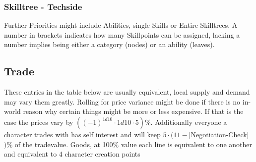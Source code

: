 \documentclass{article}
\begin{document}
    \subsubsection{Skilltree - Techside}
    Further Priorities might include Abilities, single Skills or Entire Skilltrees. A number in brackets indicates how many
    Skillpoints can be assigned, lacking a number implies being either a category (nodes) or an ability (leaves).
    \pagebreak
    \subsection{Trade}

    These entries in the table below are usually equivalent, local supply and demand may vary them greatly.
    Rolling for price variance might be done if there is no in-world reason why certain things might be more or
    less expensive. If that is the case the prices vary by \(((-1)^{1d10}\cdot1d10\cdot5) \%\).
    Additionally everyone a character trades with has self interest and will keep \(5\cdot(11-\)[Negotiation-Check]\()\%\) of
    the tradevalue.\newline \newline
    Goods, at 100\% value each line is equivalent to one another and equivalent to 4 character creation points \par
\end{document}
